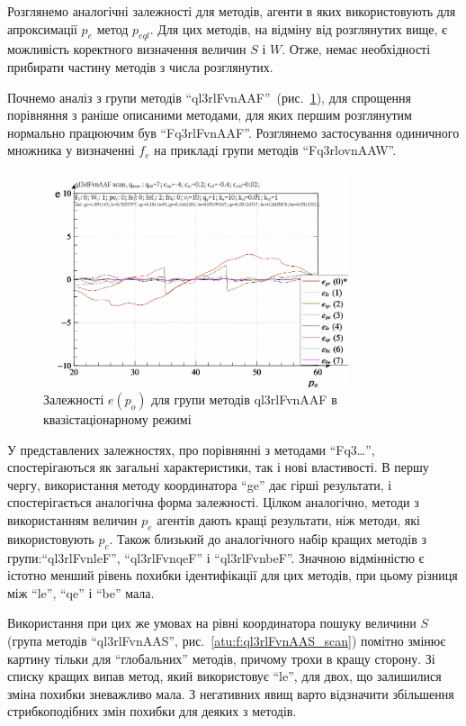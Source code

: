 Розглянемо аналогічні залежності для методів, агенти в яких
використовують для апроксимації
$p_e$ метод
$p_{eql}$. Для цих методів, на відміну від розглянутих вище, є
можливість коректного визначення величин
$S$ і
$W$. Отже, немає необхідності прибирати частину методів з числа
розглянутих.

Почнемо аналіз з групи методів ``ql3rlFvnAAF''~(рис.~\ref{atu:f:ql3rlFvnAAF_scan}),
для спрощення порівняння з раніше описаними методами, для яких
першим розглянутим нормально працюючим був ``Fq3rlFvnAAF''. Розглянемо
застосування одиничного множника у визначенні
$f_e$ на прикладі групи методів ``Fq3rlovnAAW''.

\begin{figure}[htb!]
  \begin{center}
    \includegraphics[width=0.8\textwidth]{p/scan/qls-p_p_e_ql3rlFvnAAF_scan.png}
  \end{center}
  \caption{Залежності $e(p_o)$ для групи методів ql3rlFvnAAF в квазістаціонарному режимі}
  \label{atu:f:ql3rlFvnAAF_scan}
\end{figure}

У представлених залежностях, про порівнянні з методами ``Fq3\ldots'',
спостерігаються як загальні характеристики, так і нові
властивості. В першу чергу, використання методу координатора
``ge'' дає гірші результати, і спостерігається аналогічна форма
залежності. Цілком аналогічно, методи з використанням величин
$p_e$ агентів дають кращі результати, ніж методи, які
використовують
$p_c$. Також близький до аналогічного набір кращих методів з
групи:``ql3rlFvnleF'', ``ql3rlFvnqeF'' і ``ql3rlFvnbeF''. Значною відмінністю є
істотно менший рівень похибки ідентифікації для цих методів,
при цьому різниця між ``le'', ``qe'' і ``be'' мала.


Використання при цих же умовах на рівні координатора пошуку
величини
$S$ (група методів ``ql3rlFvnAAS'', рис.~\ref{atu:f:ql3rlFvnAAS_scan}) помітно змінює
картину тільки для ``глобальних'' методів, причому трохи  в
кращу сторону. Зі списку кращих випав метод, який використовує
``le'', для двох, що залишилися зміна похибки зневажливо мала. З
негативних явищ варто відзначити збільшення стрибкоподібних
змін похибки для деяких з методів.

